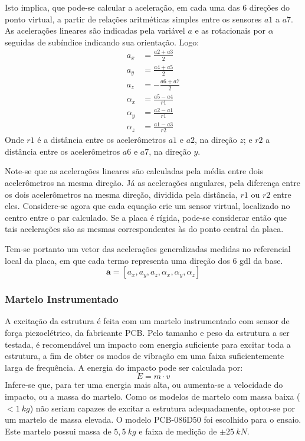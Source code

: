 Isto implica, que pode-se calcular a aceleração, em cada uma das 6 direções do
ponto virtual, a partir de relações aritméticas simples entre os sensores $a1$ a
$a7$. As acelerações lineares são indicadas pela variável $a$ e as
rotacionais por $\alpha$ seguidas de subíndice indicando sua orientação. Logo:
%
\begin{align}
	a_x &= \frac{a2+a3}{2} \label{eq::acel_ax}\\
	a_y &= \frac{a4+a5}{2} \\
	a_z &= - \frac{a6+a7}{2} \\
	\alpha_x &= \frac{a5-a4}{r1} \\
	\alpha_y &= \frac{a2-a1}{r1} \\
	\alpha_z &= \frac{a1-a3}{r2} \label{eq::acel_alphaz}
\end{align}
%
Onde $r1$ é a distância entre os acelerômetros $a1$ e $a2$, na direção $z$; e
$r2$ a distância entre os acelerômetros $a6$ e $a7$, na direção $y$.

Note-se que as acelerações lineares são calculadas pela média entre dois
acelerômetros na mesma direção.
Já as acelerações angulares, pela diferença entre os dois acelerômetros na mesma
direção, dividida pela distância, $r1$ ou $r2$ entre eles. Considere-se agora
que cada equação crie um sensor virtual, localizado no centro entre o par
calculado. Se a placa é rígida, pode-se considerar então que tais acelerações
são as mesmas correspondentes às do ponto central
da placa.

Tem-se portanto um vetor das acelerações generalizadas medidas no referencial
local da placa, em que cada termo representa uma direção dos 6 gdl da base.
%
\begin{equation}
	\mathbf{a} = \left[ a_x, a_y, a_z, \alpha_x, \alpha_y, \alpha_z \right]
\end{equation}
%

\subsubsection{Martelo Instrumentado}

A excitação da estrutura é feita com um martelo instrumentado com sensor de
força piezoelétrico, da fabricante PCB. Pelo tamanho e peso da estrutura a ser
testada, é recomendável um impacto com energia suficiente para excitar toda a
estrutura, a fim de obter os modos de vibração em uma faixa suficientemente
larga de frequência. A energia do impacto pode ser calculada por:
%
\begin{equation}
	E = m \cdot v
\end{equation}
%
Infere-se que, para ter uma energia mais alta, ou aumenta-se a velocidade do
impacto, ou a massa do martelo. Como os modelos de martelo com massa baixa
($<1~kg$) não seriam capazes de excitar a estrutura adequadamente, optou-se por
um martelo de massa elevada. O modelo PCB-086D50 foi escolhido para o ensaio.
Este martelo possui massa de $5,5~kg$ e faixa de medição de $\pm 25~kN$.


